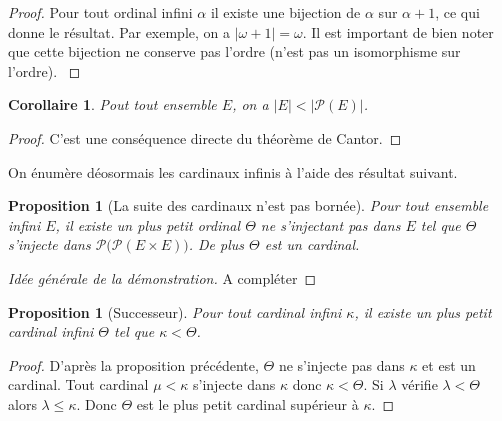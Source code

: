 \documentclass{article}
\theoremstyle{definition}
\theoremstyle{plain}
\newtheorem{proposition}[subsubsection]{Proposition}
\theoremstyle{plain}
\newtheorem{corollary}[subsubsection]{Corollaire}
\theoremstyle{plain}
\theoremstyle{plain}
\theoremstyle{plain}
\begin{document}
\begin{proof}
	Pour tout ordinal infini \( \alpha \) il existe une bijection de \( \alpha \) sur \( \alpha + 1 \), ce qui donne le résultat. Par exemple, on a \( |\omega + 1| = \omega \). Il est important de bien noter que cette bijection ne conserve pas l'ordre (n'est pas un isomorphisme sur l'ordre). \cite{gowers2010ordinals}
\end{proof}

\begin{corollary}
	Pout tout ensemble \( E \), on a \( |E| < |\mathcal{P}(E)| \).
\end{corollary}
\begin{proof}
	C'est une conséquence directe du théorème de Cantor.
\end{proof}
\par On énumère déosormais les cardinaux infinis à l'aide des résultat suivant.

\begin{proposition}[La suite des cardinaux n'est pas bornée]
	Pour tout ensemble infini \( E \), il existe un plus petit ordinal \( \Theta \) ne s'injectant pas dans \( E \) tel que \( \Theta \) s'injecte dans \( \mathcal{P(\mathcal{P}}(E \times E))\). De plus \( \Theta \) est un cardinal.
\end{proposition}
\begin{proof}[Idée générale de la démonstration]
	A compléter
\end{proof}

\begin{proposition}[Successeur]
	Pour tout cardinal infini \( \kappa \), il existe un plus petit cardinal infini \( \Theta \) tel que \( \kappa < \Theta \).
\end{proposition}
\begin{proof}
	D'après la proposition précédente, \( \Theta \) ne s'injecte pas dans \( \kappa \) et est un cardinal. Tout cardinal \( \mu < \kappa \) s'injecte dans \( \kappa \) donc \( \kappa < \Theta \). Si \( \lambda \) vérifie \( \lambda <  \Theta \) alors \( \lambda \le \kappa \). Donc \( \Theta \) est le plus petit cardinal supérieur à \( \kappa \).  
\end{proof}

\clearpage
\printbibliography
\end{document}
